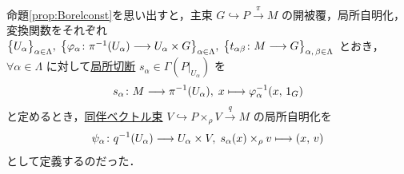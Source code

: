 \documentclass[TQFT_main]{subfiles}
\begin{document}
命題\ref{prop:Borelconst}を思い出すと，主束 $G \hookrightarrow P \xrightarrow{\pi} M$ の開被覆，局所自明化，変換関数をそれぞれ $\bigl\{ U_\alpha \bigr\}_{\alpha \in \Lambda},\; \bigl\{ \varphi_\alpha \colon \pi^{-1}(U_\alpha) \longrightarrow U_\alpha \times G \bigr\}_{\alpha \in \Lambda},\; \bigl\{  t_{\alpha\beta} \colon M \longrightarrow G  \bigr\}_{\alpha,\, \beta \in \Lambda}$ とおき，
$\forall \alpha \in \Lambda$ に対して\hyperref[def.section]{局所切断} $s_\alpha \in \Gamma(P|_{U_\alpha})$ を
\begin{align}
    \label{eq:assoc-sec}
    s_\alpha \colon M \longrightarrow \pi^{-1}(U_\alpha),\; x \longmapsto \varphi_\alpha^{-1}(x,\, 1_G)
\end{align}
と定めるとき，\hyperref[def:associated-vect]{同伴ベクトル束} $V \hookrightarrow P \times_\rho V \xrightarrow{q} M$ の局所自明化を
\begin{align}
    \label{eq:assoc-loctriv}
    \psi_\alpha \colon q^{-1}(U_\alpha) \longrightarrow U_\alpha \times V,\; s_\alpha(x) \times_\rho v \longmapsto (x,\, v)
\end{align}
として定義するのだった．
\end{document}
